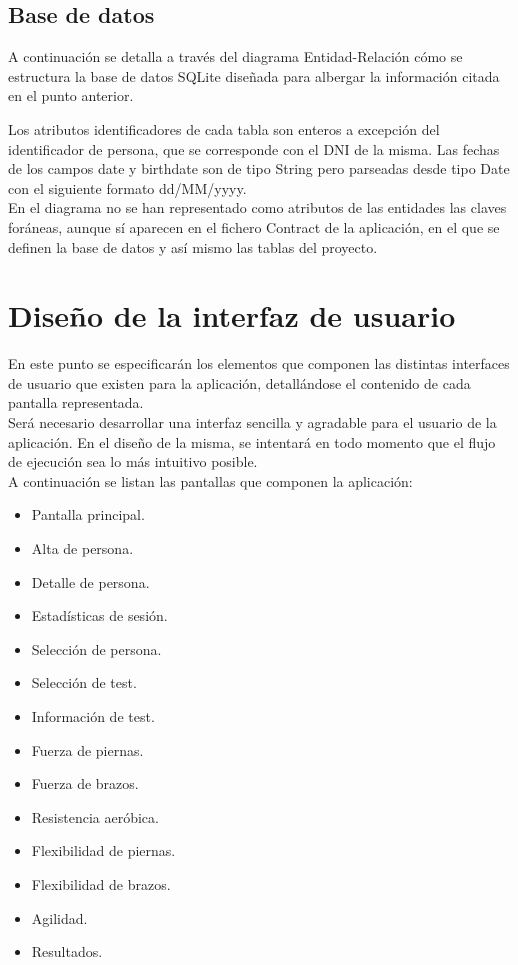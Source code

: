 \subsection{Base de datos}

A continuación se detalla a través del diagrama Entidad-Relación cómo se estructura la base de datos SQLite diseñada para albergar la información citada en el punto anterior.


Los atributos identificadores de cada tabla son enteros a excepción del identificador de persona, que se corresponde con el DNI de la misma. Las fechas de los campos date y birthdate son de tipo String pero parseadas desde tipo Date con el siguiente formato dd/MM/yyyy.\\

En el diagrama no se han representado como atributos de las entidades las claves foráneas, aunque sí aparecen en el fichero Contract de la aplicación, en el que se definen la base de datos y así mismo las tablas del proyecto.

\section{Diseño de la interfaz de usuario}

En este punto se especificarán los elementos que componen las distintas interfaces de usuario que existen para la aplicación, detallándose el contenido de cada pantalla representada.\\

Será necesario desarrollar una interfaz sencilla y agradable para el usuario de la aplicación. En el diseño de la misma, se intentará en todo momento que el flujo de ejecución sea lo más intuitivo posible.\\

A continuación se listan las pantallas que componen la aplicación:

\begin{itemize}
\item Pantalla principal.
\item Alta de persona.
\item Detalle de persona.
\item Estadísticas de sesión.
\item Selección de persona.
\item Selección de test.
\item Información de test.
\item Fuerza de piernas.
\item Fuerza de brazos.
\item Resistencia aeróbica.
\item Flexibilidad de piernas.
\item Flexibilidad de brazos.
\item Agilidad.
\item Resultados.
\end{itemize}

